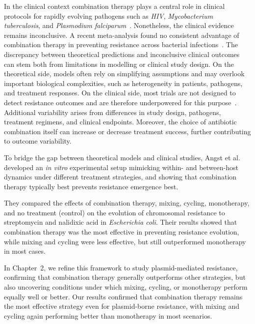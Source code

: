\documentclass[../main.tex]{subfiles}
\begin{document}
In the clinical context combination therapy plays a central role in clinical protocols for rapidly evolving pathogens such as \textit{HIV}, \textit{Mycobacterium tuberculosis}, and \textit{Plasmodium falciparum}~\cite{Goldberg2012}.
Nonetheless, the clinical evidence remains inconclusive.
A recent meta-analysis found no consistent advantage of combination therapy in preventing resistance across bacterial infections~\cite{siedentop_metaanalysis_2024}.
The discrepancy between theoretical predictions and inconclusive clinical outcomes can stem both from limitations in modelling or clinical study design.
On the theoretical side, models often rely on simplifying assumptions and may overlook important biological complexities, such as heterogeneity in patients, pathogens, and treatment responses.
On the clinical side, most trials are not designed to detect resistance outcomes and are therefore underpowered for this purpose~\cite{siedentop_metaanalysis_2024}.
Additional variability arises from differences in study design, pathogens, treatment regimens, and clinical endpoints.
Moreover, the choice of antibiotic combination itself can increase or decrease treatment success, further contributing to outcome variability.

To bridge the gap between theoretical models and clinical studies, Angst et al.~\cite{Angst2021} developed an \textit{in vitro} experimental setup mimicking within- and between-host dynamics under different treatment strategies, and showing that combination therapy typically best prevents resistance emergence best.

They compared the effects of combination therapy, mixing, cycling, monotherapy, and no treatment (control) on the evolution of chromosomal resistance to streptomycin and nalidixic acid in \textit{Escherichia coli}.
Their results showed that combination therapy was the most effective in preventing resistance evolution, while mixing and cycling were less effective, but still outperformed monotherapy in most cases.

In Chapter~2, we refine this framework to study plasmid-mediated resistance, confirming that combination therapy generally outperforms other strategies, but also uncovering conditions under which mixing, cycling, or monotherapy perform equally well or better.
Our results confirmed that combination therapy remains the most effective strategy even for plasmid-borne resistance, with mixing and cycling again performing better than monotherapy in most scenarios.
\end{document}
